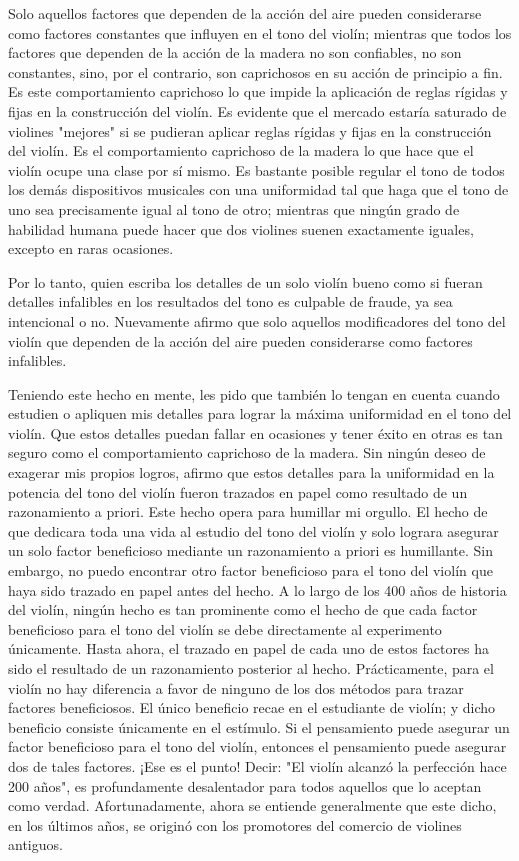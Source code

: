 \documentclass[12pt]{book}
\begin{document}
Solo aquellos factores que dependen de la acción del aire pueden considerarse como factores constantes que influyen en el tono del violín; mientras que todos los factores que dependen de la acción de la madera no son confiables, no son constantes, sino, por el contrario, son caprichosos en su acción de principio a fin. Es este comportamiento caprichoso lo que impide la aplicación de reglas rígidas y fijas en la construcción del violín. Es evidente que el mercado estaría saturado de violines "mejores" si se pudieran aplicar reglas rígidas y fijas en la construcción del violín. Es el comportamiento caprichoso de la madera lo que hace que el violín ocupe una clase por sí mismo. Es bastante posible regular el tono de todos los demás dispositivos musicales con una uniformidad tal que haga que el tono de uno sea precisamente igual al tono de otro; mientras que ningún grado de habilidad humana puede hacer que dos violines suenen exactamente iguales, excepto en raras ocasiones.

Por lo tanto, quien escriba los detalles de un solo violín bueno como si fueran detalles infalibles en los resultados del tono es culpable de fraude, ya sea intencional o no. Nuevamente afirmo que solo aquellos modificadores del tono del violín que dependen de la acción del aire pueden considerarse como factores infalibles.

Teniendo este hecho en mente, les pido que también lo tengan en cuenta cuando estudien o apliquen mis detalles para lograr la máxima uniformidad en el tono del violín. Que estos detalles puedan fallar en ocasiones y tener éxito en otras es tan seguro como el comportamiento caprichoso de la madera. Sin ningún deseo de exagerar mis propios logros, afirmo que estos detalles para la uniformidad en la potencia del tono del violín fueron trazados en papel como resultado de un razonamiento a priori. Este hecho opera para humillar mi orgullo. El hecho de que dedicara toda una vida al estudio del tono del violín y solo lograra asegurar un solo factor beneficioso mediante un razonamiento a priori es humillante. Sin embargo, no puedo encontrar otro factor beneficioso para el tono del violín que haya sido trazado en papel antes del hecho. A lo largo de los 400 años de historia del violín, ningún hecho es tan prominente como el hecho de que cada factor beneficioso para el tono del violín se debe directamente al experimento únicamente. Hasta ahora, el trazado en papel de cada uno de estos factores ha sido el resultado de un razonamiento posterior al hecho. Prácticamente, para el violín no hay diferencia a favor de ninguno de los dos métodos para trazar factores beneficiosos. El único beneficio recae en el estudiante de violín; y dicho beneficio consiste únicamente en el estímulo. Si el pensamiento puede asegurar un factor beneficioso para el tono del violín, entonces el pensamiento puede asegurar dos de tales factores. ¡Ese es el punto! Decir: "El violín alcanzó la perfección hace 200 años", es profundamente desalentador para todos aquellos que lo aceptan como verdad. Afortunadamente, ahora se entiende generalmente que este dicho, en los últimos años, se originó con los promotores del comercio de violines antiguos.
\end{document}
